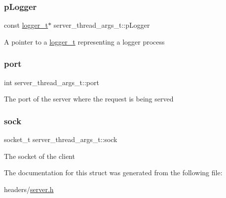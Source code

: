 \subsubsection{\texorpdfstring{p\+Logger}{pLogger}}
{\footnotesize\ttfamily const \hyperlink{structlogger__t}{logger\+\_\+t}$\ast$ server\+\_\+thread\+\_\+args\+\_\+t\+::p\+Logger}

A pointer to a \hyperlink{structlogger__t}{logger\+\_\+t} representing a logger process \mbox{\label{structserver__thread__args__t_a0bf51eeb92c580aad89b8492cdb7c9bd}} 
\subsubsection{\texorpdfstring{port}{port}}
{\footnotesize\ttfamily int server\+\_\+thread\+\_\+args\+\_\+t\+::port}

The port of the server where the request is being served \mbox{\label{structserver__thread__args__t_afcaca013fc84d1969ccb28c907ccff77}} 
\subsubsection{\texorpdfstring{sock}{sock}}
{\footnotesize\ttfamily socket\+\_\+t server\+\_\+thread\+\_\+args\+\_\+t\+::sock}

The socket of the client 

The documentation for this struct was generated from the following file\+:\begin{DoxyCompactItemize}
\item 
headers/\hyperlink{server_8h}{server.\+h}\end{DoxyCompactItemize}
